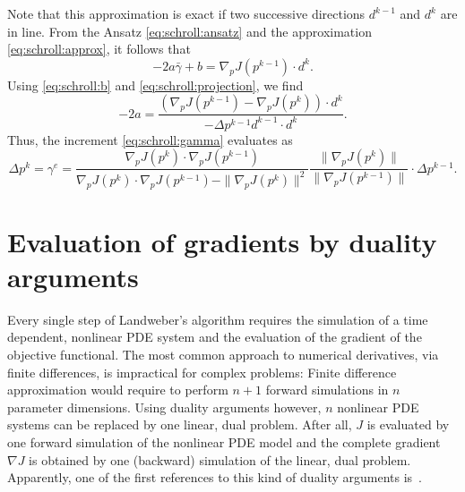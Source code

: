 Note that this approximation is exact
if two successive directions $d^{k-1}$ and $d^k$ are in line.
From the Ansatz \eqref{eq:schroll:ansatz} and the approximation
\eqref{eq:schroll:approx}, it follows that
\begin{equation}
 -2a \bar\gamma +b = \nabla_p J(p^{k-1}) \cdot d^k.
\end{equation}
Using \eqref{eq:schroll:b} and \eqref{eq:schroll:projection}, we find
\begin{equation}
 -2 a =
 \frac{(\nabla_p J(p^{k-1}) - \nabla_p J(p^k))\cdot d^k}
      {-\Delta p^{k-1} d^{k-1} \cdot d^k}.
\end{equation}
Thus, the increment \eqref{eq:schroll:gamma} evaluates as
\begin{equation}
 \Delta p^k = \gamma^e =
 \frac{\nabla_p J(p^k)\cdot \nabla_p J(p^{k-1})}
      {\nabla_p J(p^k)\cdot \nabla_p J(p^{k-1}) - \|\nabla_p J(p^k)\|^2}
 \frac{\|\nabla_p J(p^k)\|}{\|\nabla_p J(p^{k-1})\|} \cdot
 \Delta p^{k-1}.
\end{equation}

\section{Evaluation of gradients by duality arguments}

Every single step of Landweber's algorithm requires the simulation of
a time dependent, nonlinear PDE system and the evaluation of the
gradient of the objective functional.  The most common approach to
numerical derivatives, via finite differences, is impractical for
complex problems: Finite difference approximation would require to
perform $n+1$ forward simulations in $n$ parameter dimensions.  Using
duality arguments however, $n$ nonlinear PDE systems can be replaced
by one linear, dual problem.  After all, $J$ is evaluated by one
forward simulation of the nonlinear PDE model and the complete
gradient $\nabla J$ is obtained by one (backward) simulation of the
linear, dual problem.  Apparently, one of the first references to this
kind of duality arguments is~\citet{ChaventLemmonier1974}.

